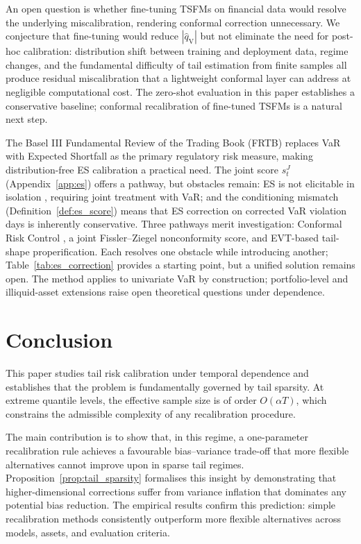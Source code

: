 \documentclass[preprint,11pt,authoryear]{elsarticle}
\newcommand{\1}{\boldsymbol{1}}
\newcommand{\qV}{\hat{q}_{\scriptscriptstyle\mathrm{V}}}
\begin{document}
	An open question is whether fine-tuning TSFMs on financial
	data would resolve the underlying miscalibration, rendering
	conformal correction unnecessary. We conjecture that
	fine-tuning would reduce $|\qV|$ but not eliminate the need
	for post-hoc calibration: distribution shift between training
	and deployment data, regime changes, and the fundamental
	difficulty of tail estimation from finite samples all produce
	residual miscalibration that a lightweight conformal layer can
	address at negligible computational cost. The zero-shot
	evaluation in this paper establishes a conservative baseline;
	conformal recalibration of fine-tuned TSFMs is a natural next
	step.
	
	The Basel III Fundamental Review of the Trading Book (FRTB) replaces VaR with Expected Shortfall as the primary regulatory risk measure, making distribution-free ES calibration a practical need. The joint score $s^J_t$ (Appendix~\ref{app:es}) offers a pathway, but obstacles remain: ES is not elicitable in isolation \citep{gneiting2011making}, requiring joint treatment with VaR; and the conditioning mismatch (Definition~\ref{def:es_score}) means that ES correction on corrected VaR violation days is inherently conservative. Three pathways merit investigation: Conformal Risk Control \citep{angelopoulos2024conformal}, a joint Fissler--Ziegel nonconformity score, and EVT-based tail-shape properification. Each resolves one obstacle while introducing another; Table~\ref{tab:es_correction} provides a starting point, but a unified solution remains open. The method applies to univariate VaR by construction; portfolio-level and illiquid-asset extensions raise open theoretical questions under dependence.
	
	\section{Conclusion}
	\label{sec:conclude}
	
	This paper studies tail risk calibration under temporal dependence and establishes that the problem is fundamentally governed by tail sparsity. At extreme quantile levels, the effective sample size is of order $O(\alpha T)$, which constrains the admissible complexity of any recalibration procedure.

	The main contribution is to show that, in this regime, a one-parameter recalibration rule achieves a favourable bias--variance trade-off that more flexible alternatives cannot improve upon in sparse tail regimes. Proposition~\ref{prop:tail_sparsity} formalises this insight by demonstrating that higher-dimensional corrections suffer from variance inflation that dominates any potential bias reduction. The empirical results confirm this prediction: simple recalibration methods consistently outperform more flexible alternatives across models, assets, and evaluation criteria.
\end{document}
